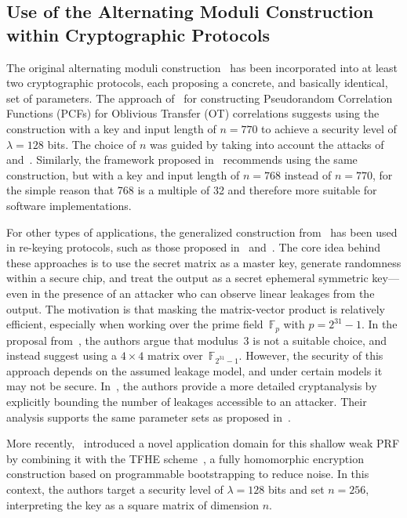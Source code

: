 \subsection{Use of the Alternating Moduli Construction within Cryptographic Protocols}
\label{sec:bipsw_app}
The original alternating moduli construction~\cite{TCC:BIPSW18} has been incorporated into at least two cryptographic protocols, each proposing a concrete, and basically identical, set of parameters. The approach of~\cite{EC:BCMPR24} for constructing Pseudorandom Correlation Functions (PCFs) for Oblivious Transfer (OT) correlations suggests using the construction with a key and input length of $n = 770$ to achieve a security level of $\lambda = 128$ bits. The choice of $n$ was guided by taking into account the attacks of~\cite{PKC:CCKK21} and~\cite{JMN23}. Similarly, the framework proposed in~\cite{AC:CDDKS24} recommends using the same construction, but with a key and input length of $n = 768$ instead of $n = 770$, for the simple reason that 768 is a multiple of 32 and therefore more suitable for software implementations.

For other types of applications, the generalized construction from~\cite{C:DGHIKS21} has been used in re-keying protocols, such as those proposed in~\cite{TCHES:DMMS21} and~\cite{C:HMMRSU23}. The core idea behind these approaches is to use the secret matrix as a master key, generate randomness within a secure chip, and treat the output as a secret ephemeral symmetric key—even in the presence of an attacker who can observe linear leakages from the output. The motivation is that masking the matrix-vector product is relatively efficient, especially when working over the prime field~$\mathbb{F}_p$ with $p = 2^{31} - 1$. In the proposal from~\cite{TCHES:DMMS21}, the authors argue that modulus~3 is not a suitable choice, and instead suggest using a $4 \times 4$ matrix over~$\mathbb{F}_{2^{31}-1}$. However, the security of this approach depends on the assumed leakage model, and under certain models it may not be secure. In~\cite{C:HMMRSU23}, the authors provide a more detailed cryptanalysis by explicitly bounding the number of leakages accessible to an attacker. Their analysis supports the same parameter sets as proposed in~\cite{TCHES:DMMS21}.


More recently,~\cite{EC:ADDG24} introduced a novel application domain for this shallow weak PRF by combining it with the TFHE scheme~\cite{JC:CGGI20}, a fully homomorphic encryption construction based on programmable bootstrapping to reduce noise. In this context, the authors target a security level of $\lambda = 128$ bits and set $n = 256$, interpreting the key as a square matrix of dimension $n$.

